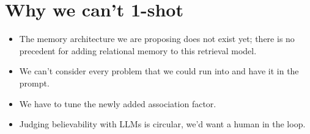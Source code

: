 \documentclass[11pt]{article}
\begin{document}
\section{Why we can't 1-shot}
\begin{itemize}
  \item The memory architecture we are proposing does not exist yet; there is no precedent for adding relational memory to this retrieval model.
  \item We can't consider every problem that we could run into and have it in the prompt.
  \item We have to tune the newly added association factor.
  \item Judging believability with LLMs is circular, we'd want a human in the loop.
\end{itemize}

\printbibliography
\end{document}
